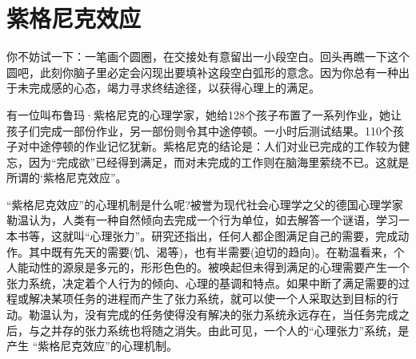 \documentclass[11pt]{ctexart}
\begin{document}
\section{紫格尼克效应}
\label{sec-98}


你不妨试一下：一笔画个圆圈，在交接处有意留出一小段空白。回头再瞧一下这个圆吧，此刻你脑子里必定会闪现出要填补这段空白弧形的意念。因为你总有一种出于未完成感的心态，竭力寻求终结途径，以获得心理上的满足。

有一位叫布鲁玛·紫格尼克的心理学家，她给128个孩子布置了一系列作业，她让孩子们完成一部份作业，另一部份则令其中途停顿。一小时后测试结果。110个孩子对中途停顿的作业记忆犹新。紫格尼克的结论是：人们对业已完成的工作较为健忘，因为“完成欲”已经得到满足，而对未完成的工作则在脑海里萦绕不已。这就是所谓的‘紫格尼克效应”。

“紫格尼克效应”的心理机制是什么呢?被誉为现代社会心理学之父的德国心理学家勒温认为，人类有一种自然倾向去完成一个行为单位，如去解答一个谜语，学习一本书等，这就叫“心理张力”。研究还指出，任何人都企图满足自己的需要，完成动作。其中既有先天的需要(饥、渴等)，也有半需要(迫切的趋向)。在勒温看来，个人能动性的源泉是多元的，形形色色的。被唤起但未得到满足的心理需要产生一个张力系统，决定着个人行为的倾向、心理的基调和特点。如果中断了满足需要的过程或解决某项任务的进程而产生了张力系统，就可以使一个人采取达到目标的行动。勒温认为，没有完成的任务使得没有解决的张力系统永远存在，当任务完成之后，与之并存的张力系统也将随之消失。由此可见，一个人的“心理张力”系统，是产生 “紫格尼克效应”的心理机制。
\end{document}
